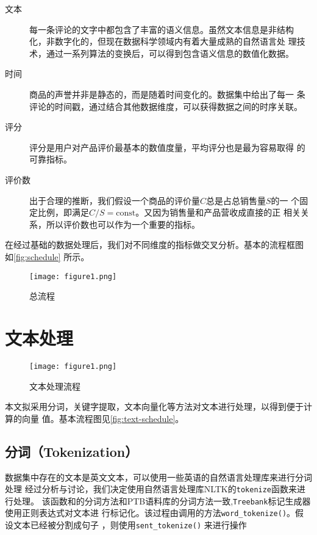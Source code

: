 \begin{description}
    \item [文本] 每一条评论的文字中都包含了丰富的语义信息。虽然文本信息是非结构
        化，非数字化的，但现在数据科学领域内有着大量成熟的{\fKai 自然语言处
        理}技术，通过一系列算法的变换后，可以得到包含语义信息的数值化数据。
    \item [时间] 商品的声誉并非是静态的，而是随着时间变化的。数据集中给出了每一
        条评论的时间戳，通过结合其他数据维度，可以获得数据之间的时序关联。
    \item [评分] 评分是用户对产品评价最基本的数值度量，平均评分也是最为容易取得
        的可靠指标。
    \item [评价数] 出于合理的推断，我们假设一个商品的评价量$C$总是占总销售量$S$的一
        个固定比例，即满足$C/S=\textrm{const}$。又因为销售量和产品营收成直接的正
        相关关系，所以评价数也可以作为一个重要的指标。
\end{description}

在经过基础的数据处理后，我们对不同维度的指标做交叉分析。基本的流程框图
如\autoref{fig:schedule} 所示。

\begin{figure}
    \centering
    \texttt{[image: figure1.png]}
    \caption{总流程}
    \label{fig:schedule}
\end{figure}


\section{文本处理}

\begin{figure}
    \centering
    \texttt{[image: figure1.png]}
    \caption{文本处理流程}
    \label{fig:text-schedule}
\end{figure}

本文拟采用分词，关键字提取，文本向量化等方法对文本进行处理，以得到便于计算的向量
值。基本流程图见\autoref{fig:text-schedule}。

\subsection{分词（Tokenization）}
数据集中存在的文本是英文文本，可以使用一些英语的自然语言处理库来进行分词处理
经过分析与讨论，我们决定使用自然语言处理库NLTK的\texttt{tokenize}函数来进行处理。
该函数和的分词方法和PTB语料库的分词方法一致,\texttt{Treebank}标记生成器使用正则表达式对文本进
行标记化。该过程由调用的方法\texttt{word\_tokenize()}。假设文本已经被分割成句子
，则使用\texttt{sent\_tokenize()}
来进行操作

